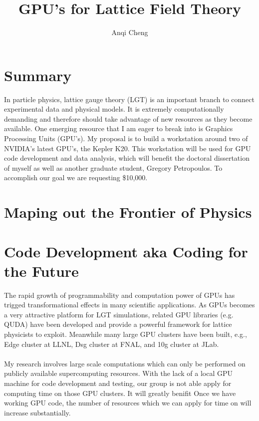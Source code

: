 \documentclass[11pt]{article}
\begin{document}
  \title{GPU's for Lattice Field Theory}
  \author{Anqi Cheng}
  \maketitle

   \section*{Summary} %
In particle physics, lattice gauge theory (LGT) is an important branch to connect experimental data and physical models.
It is extremely computationally demanding and therefore should take advantage of new  resources as they become available.
One emerging resource that I am eager to break into is Graphics Processing Units (GPU's).   
My proposal is to build a workstation around two of NVIDIA's latest GPU's, the Kepler K20.  
This workstation will be used for GPU code development and data analysis, which will benefit the doctoral dissertation of myself 
as well as another graduate student, Gregory Petropoulos.  
To accomplish our goal we are requesting \$10,000.  
 
  \section*{Maping out the Frontier of Physics} %
  
  
  \section*{Code Development aka Coding for the Future} %
 The rapid growth of programmability and computation power of GPUs has trigged transformational effects in many scientific applications. As GPUs becomes 
 a very attractive platform for LGT simulations, related GPU libraries (e.g. QUDA) have been developed and  
 provide a powerful framework for lattice physicists to exploit. Meanwhile many large GPU clusters have been built, e.g., Edge cluster at LLNL,
 Dsg cluster at FNAL, and 10g cluster at JLab.\\\\
 My research involves large scale computations which can only be performed on publicly available supercomputing resources. With the lack of a local GPU machine for code development and testing, our group is not able apply for computing time on those GPU clusters. It will greatly benifit 
  Once we have working GPU code, the number of resources which we can apply for time on will increase substantially.\\\\
\end{document}
